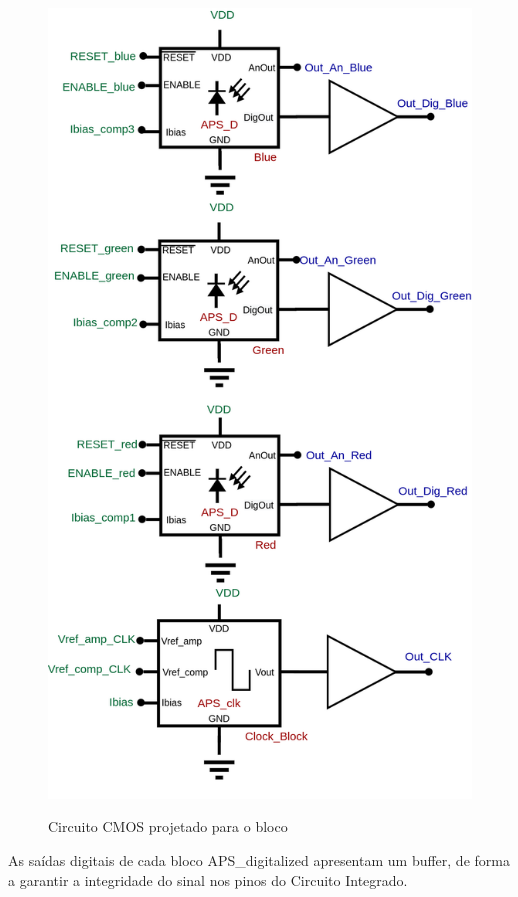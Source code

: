 \begin{figure}[!h]
 \centering
    \centering
    \caption{Circuito CMOS projetado para o bloco \NomeBloco} 
    \includegraphics[scale=0.3]{Circuitos/APS_3.png}
    \label{\NomePFig}
\end{figure}

As sa\'idas digitais de cada bloco APS\_digitalized apresentam um buffer, de forma a garantir a integridade do sinal nos pinos do Circuito Integrado.